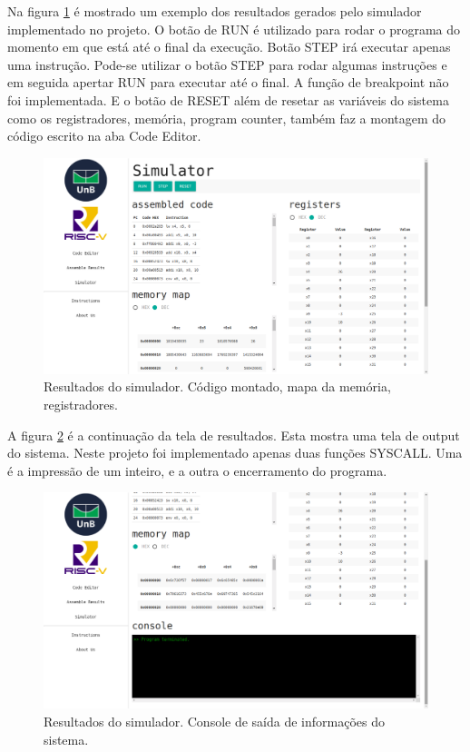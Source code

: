 	Na figura \ref{fig:simulator_results_1} é mostrado um exemplo dos resultados gerados pelo simulador implementado no projeto. O botão de RUN é utilizado para rodar o programa do momento em que está até o final da execução. Botão STEP irá executar apenas uma instrução. Pode-se utilizar o botão STEP para rodar algumas instruções e em seguida apertar RUN para executar até o final. A função de breakpoint não foi implementada. E o botão de RESET além de resetar as variáveis do sistema como os registradores, memória, program counter, também faz a montagem do código escrito na aba Code Editor.

	\begin{figure}[h!]
	  \includegraphics[width=\linewidth]{img/simulator_results_1.png}
	  \caption{Resultados do simulador. Código montado, mapa da memória, registradores. }
	  \label{fig:simulator_results_1}
	\end{figure}

	A figura \ref{fig:simulator_results_2} é a continuação da tela de resultados. Esta mostra uma tela de output do sistema. Neste projeto foi implementado apenas duas funções SYSCALL. Uma é a impressão de um inteiro, e a outra o encerramento do programa.  

	\begin{figure}[h!]
	  \includegraphics[width=\linewidth]{img/simulator_results_2.png}
	  \caption{Resultados do simulador. Console de saída de informações do sistema.}
	  \label{fig:simulator_results_2}
	\end{figure}

